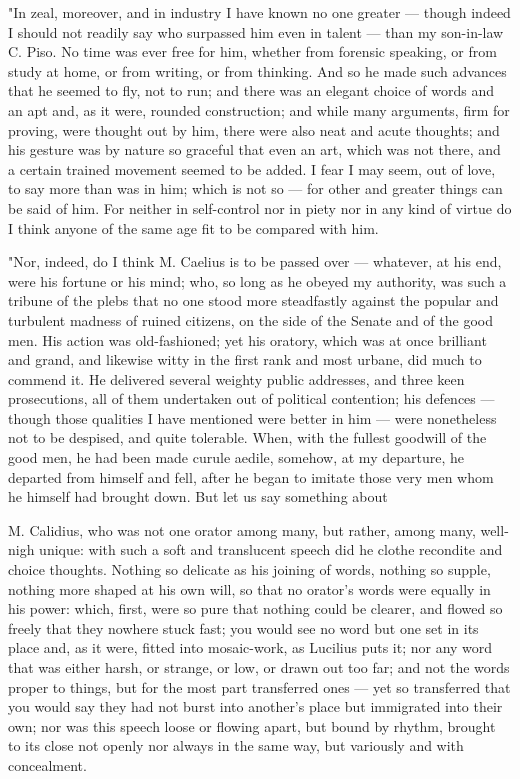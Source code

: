  "In zeal, moreover, and in industry I have known no one greater — though indeed I should not readily say who surpassed him even in talent — than my son-in-law C. Piso. No time was ever free for him, whether from forensic speaking, or from study at home, or from writing, or from thinking. And so he made such advances that he seemed to fly, not to run; and there was an elegant choice of words and an apt and, as it were, rounded construction; and while many arguments, firm for proving, were thought out by him, there were also neat and acute thoughts; and his gesture was by nature so graceful that even an art, which was not there, and a certain trained movement seemed to be added. I fear I may seem, out of love, to say more than was in him; which is not so — for other and greater things can be said of him. For neither in self-control nor in piety nor in any kind of virtue do I think anyone of the same age fit to be compared with him.

 "Nor, indeed, do I think M. Caelius is to be passed over — whatever, at his end, were his fortune or his mind; who, so long as he obeyed my authority, was such a tribune of the plebs that no one stood more steadfastly against the popular and turbulent madness of ruined citizens, on the side of the Senate and of the good men. His action was old-fashioned; yet his oratory, which was at once brilliant and grand, and likewise witty in the first rank and most urbane, did much to commend it. He delivered several weighty public addresses, and three keen prosecutions, all of them undertaken out of political contention; his defences — though those qualities I have mentioned were better in him — were nonetheless not to be despised, and quite tolerable. When, with the fullest goodwill of the good men, he had been made curule aedile, somehow, at my departure, he departed from himself and fell, after he began to imitate those very men whom he himself had brought down. But let us say something about

 M. Calidius, who was not one orator among many, but rather, among many, well-nigh unique: with such a soft and translucent speech did he clothe recondite and choice thoughts. Nothing so delicate as his joining of words, nothing so supple, nothing more shaped at his own will, so that no orator's words were equally in his power: which, first, were so pure that nothing could be clearer, and flowed so freely that they nowhere stuck fast; you would see no word but one set in its place and, as it were, fitted into mosaic-work, as Lucilius puts it; nor any word that was either harsh, or strange, or low, or drawn out too far; and not the words proper to things, but for the most part transferred ones — yet so transferred that you would say they had not burst into another's place but immigrated into their own; nor was this speech loose or flowing apart, but bound by rhythm, brought to its close not openly nor always in the same way, but variously and with concealment.

